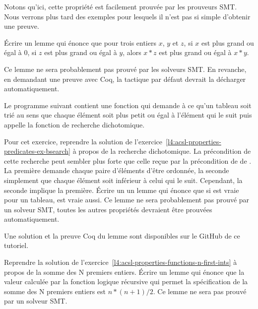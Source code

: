 Notons qu'ici, cette propriété est facilement prouvée par les prouveurs SMT. Nous
verrons plus tard des exemples pour lesquels il n'est pas si simple d'obtenir une
preuve.







Écrire un lemme qui énonce que pour trois entiers $x$, $y$ et $z$, si $x$ est
plus grand ou égal à $0$, si $z$ est plus grand ou égal à $y$, alors $x * z$
est  plus grand ou égal à $x * y$.


Ce lemme ne sera probablement pas prouvé par les solveurs SMT. En revanche, en
demandant une preuve avec Coq, la tactique par défaut devrait la décharger
automatiquement.


\label{l4:acsl-properties-lemmas-lsorted-gsorted}


Le programme suivant contient une fonction qui demande à ce qu'un tableau soit
trié au sens que chaque élément soit plus petit ou égal à l'élément qui le suit
puis appelle la fonction de recherche dichotomique.




Pour cet exercice, reprendre la solution de
l'exercice~\ref{l4:acsl-properties-predicates-ex-bsearch} à propos de la recherche
dichotomique. La précondition de cette recherche peut sembler plus forte que celle
reçue par la précondition de de . La première demande
chaque paire d'éléments d'être ordonnée, la seconde simplement que chaque élément
soit inférieur à celui qui le suit. Cependant, la seconde implique la première.
Écrire un un lemme qui énonce que si  est vraie
pour un tableau,  est vraie aussi. Ce lemme ne sera probablement
pas prouvé par un solveur SMT, toutes les autres propriétés devraient être prouvées
automatiquement.


Une solution et la preuve Coq du lemme sont disponibles sur le GitHub de ce tutoriel.


\label{l4:acsl-properties-lemmas-n-first-ints}


Reprendre la solution de l'exercice~\ref{l4:acsl-properties-functions-n-first-ints}
à propos de la somme des N premiers entiers. Écrire un lemme qui énonce que la valeur
calculée par la fonction logique récursive qui permet la spécification de la somme des
N premiers entiers est $n*(n+1)/2$. Ce lemme ne sera pas prouvé par un solveur SMT.


